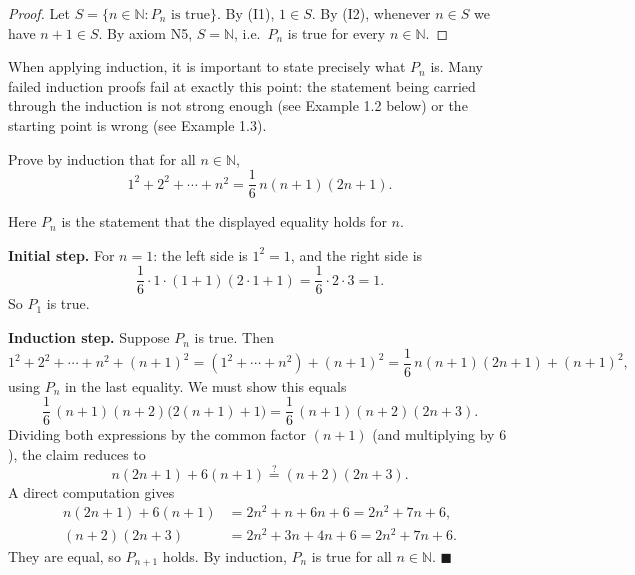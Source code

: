 \documentclass[11pt]{report}
\begin{document}
\begin{proof}
Let $S = \{n \in \mathbb{N} : P_n \text{ is true}\}$. By (I1), $1 \in S$. By (I2), whenever $n \in S$ we have $n+1 \in S$. By axiom N5, $S = \mathbb{N}$, i.e.\ $P_n$ is true for every $n \in \mathbb{N}$.
\end{proof}

\begin{rembox}
When applying induction, it is important to state precisely what $P_n$ is. Many failed induction proofs fail at exactly this point: the statement being carried through the induction is not strong enough (see Example 1.2 below) or the starting point is wrong (see Example 1.3).
\end{rembox}

\begin{exbox}
Prove by induction that for all $n \in \mathbb{N}$,
\[
1^2 + 2^2 + \cdots + n^2 = \frac{1}{6}\, n(n+1)(2n+1).
\]

Here $P_n$ is the statement that the displayed equality holds for $n$.

\textbf{Initial step.} For $n = 1$: the left side is $1^2 = 1$, and the right side is
\[
\frac{1}{6}\cdot 1 \cdot (1+1)(2\cdot 1 + 1) = \frac{1}{6}\cdot 2 \cdot 3 = 1.
\]
So $P_1$ is true.

\textbf{Induction step.} Suppose $P_n$ is true. Then
\[
1^2 + 2^2 + \cdots + n^2 + (n+1)^2
= \left(1^2 + \cdots + n^2\right) + (n+1)^2
= \frac{1}{6}\, n(n+1)(2n+1) + (n+1)^2,
\]
using $P_n$ in the last equality. We must show this equals
\[
\frac{1}{6}\,(n+1)(n+2)\bigl(2(n+1)+1\bigr) = \frac{1}{6}\,(n+1)(n+2)(2n+3).
\]
Dividing both expressions by the common factor $(n+1)$ (and multiplying by $6$), the claim reduces to
\[
n(2n+1) + 6(n+1) \overset{?}{=} (n+2)(2n+3).
\]
A direct computation gives
\begin{align*}
n(2n+1) + 6(n+1) &= 2n^2 + n + 6n + 6 = 2n^2 + 7n + 6,\\
(n+2)(2n+3) &= 2n^2 + 3n + 4n + 6 = 2n^2 + 7n + 6.
\end{align*}
They are equal, so $P_{n+1}$ holds. By induction, $P_n$ is true for all $n \in \mathbb{N}$. \hfill $\blacksquare$
\end{exbox}
\end{document}
